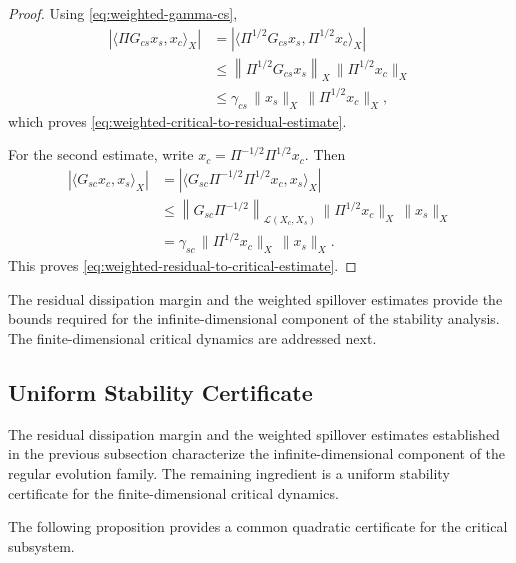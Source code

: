 \documentclass[pdflatex,sn-mathphys-num]{sn-jnl}
\theoremstyle{thmstyleone}%
\theoremstyle{thmstyletwo}%
\theoremstyle{thmstylethree}%
\begin{document}
\begin{proof}

Using
\eqref{eq:weighted-gamma-cs},
\[
\begin{aligned}
\left|
\langle
\Pi G_{cs}x_s,x_c
\rangle_X
\right|
&=
\left|
\langle
\Pi^{1/2}G_{cs}x_s,
\Pi^{1/2}x_c
\rangle_X
\right|
\\
&\le
\left\|
\Pi^{1/2}G_{cs}x_s
\right\|_X
\,
\|\Pi^{1/2}x_c\|_X
\\
&\le
\gamma_{cs}
\,
\|x_s\|_X
\,
\|\Pi^{1/2}x_c\|_X,
\end{aligned}
\]
which proves
\eqref{eq:weighted-critical-to-residual-estimate}.

For the second estimate, write \(x_c=\Pi^{-1/2}\Pi^{1/2}x_c\). Then
\[
\begin{aligned}
\left|
\langle
G_{sc}x_c,x_s
\rangle_X
\right|
&=
\left|
\langle
G_{sc}\Pi^{-1/2}
\Pi^{1/2}x_c,
x_s
\rangle_X
\right|
\\
&\le
\left\|
G_{sc}\Pi^{-1/2}
\right\|_{\mathcal L(X_c,X_s)}
\,
\|\Pi^{1/2}x_c\|_X
\,
\|x_s\|_X
\\
&=
\gamma_{sc}
\,
\|\Pi^{1/2}x_c\|_X
\,
\|x_s\|_X.
\end{aligned}
\]
This proves
\eqref{eq:weighted-residual-to-critical-estimate}.

\end{proof}

The residual dissipation margin and the weighted spillover estimates  provide the bounds required for the infinite-dimensional component of the stability analysis. The finite-dimensional critical dynamics are addressed next.

\subsection{Uniform Stability Certificate}
\label{subsec:uniform-certificate}

The residual dissipation margin and the weighted spillover estimates established in the previous subsection characterize the
infinite-dimensional component of the regular evolution family. The remaining ingredient is a uniform stability certificate for the finite-dimensional critical dynamics.

The following proposition provides a common quadratic certificate for the critical subsystem.
\end{document}
